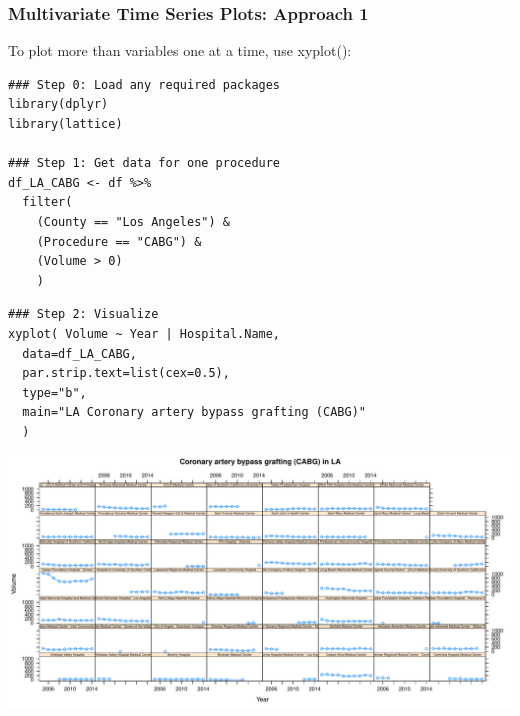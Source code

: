 \begin{frame}
 \frametitle{Multivariate Time Series Plots: Approach 1}

To plot more than variables one at a time, use \ttfamily xyplot()\normalfont [5]:
		\begin{lstlisting}
### Step 0: Load any required packages
library(dplyr)
library(lattice)

### Step 1: Get data for one procedure
df_LA_CABG <- df %>%
  filter( 
    (County == "Los Angeles") & 
    (Procedure == "CABG") & 
    (Volume > 0) 
    )
    \end{lstlisting}

\newpage    
    \begin{lstlisting}
### Step 2: Visualize    
xyplot( Volume ~ Year | Hospital.Name, 
  data=df_LA_CABG,
  par.strip.text=list(cex=0.5),
  type="b",
  main="LA Coronary artery bypass grafting (CABG)"
  )
		\end{lstlisting}

\newpage
      \begin{center}
         \includegraphics[width=1.05\textwidth]{images/timeseries_LA_CABG}
      \end{center}
\end{frame}

